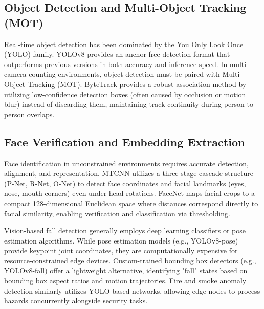 \documentclass[12pt,a4paper]{article}
\begin{document}
\subsection{Object Detection and Multi-Object Tracking (MOT)}
Real-time object detection has been dominated by the You Only Look Once (YOLO) family. YOLOv8 \cite{yolov8_2023} provides an anchor-free detection format that outperforms previous versions in both accuracy and inference speed. In multi-camera counting environments, object detection must be paired with Multi-Object Tracking (MOT). ByteTrack \cite{bytetrack_2022} provides a robust association method by utilizing low-confidence detection boxes (often caused by occlusion or motion blur) instead of discarding them, maintaining track continuity during person-to-person overlaps.

\subsection{Face Verification and Embedding Extraction}
Face identification in unconstrained environments requires accurate detection, alignment, and representation. MTCNN \cite{mtcnn_2016} utilizes a three-stage cascade structure (P-Net, R-Net, O-Net) to detect face coordinates and facial landmarks (eyes, nose, mouth corners) even under head rotations. FaceNet \cite{facenet_2015} maps facial crops to a compact 128-dimensional Euclidean space where distances correspond directly to facial similarity, enabling verification and classification via thresholding.

Vision-based fall detection generally employs deep learning classifiers or pose estimation algorithms. While pose estimation models (e.g., YOLOv8-pose) provide keypoint joint coordinates, they are computationally expensive for resource-constrained edge devices. Custom-trained bounding box detectors (e.g., YOLOv8-fall) offer a lightweight alternative, identifying "fall" states based on bounding box aspect ratios and motion trajectories. Fire and smoke anomaly detection similarly utilizes YOLO-based networks, allowing edge nodes to process hazards concurrently alongside security tasks.
\end{document}

